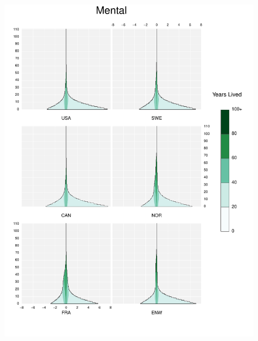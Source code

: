 \documentclass{article}
\begin{document}
\begin{appendices}
\begin{figure}
\includegraphics[scale=.8]{Figures/Causes/DyxMental.pdf}
\end{figure}
\begin{figure}
\centering

\end{figure}
\end{appendices}
\end{document}
